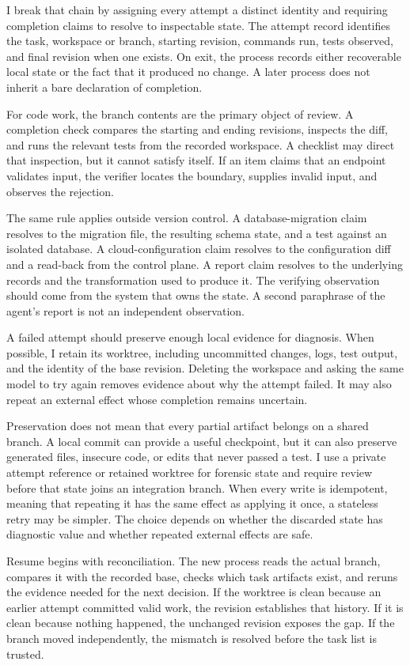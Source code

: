 I break that chain by assigning every attempt a distinct identity and requiring completion claims to resolve to inspectable state. The attempt record identifies the task, workspace or branch, starting revision, commands run, tests observed, and final revision when one exists. On exit, the process records either recoverable local state or the fact that it produced no change. A later process does not inherit a bare declaration of completion.

For code work, the branch contents are the primary object of review. A completion check compares the starting and ending revisions, inspects the diff, and runs the relevant tests from the recorded workspace. A checklist may direct that inspection, but it cannot satisfy itself. If an item claims that an endpoint validates input, the verifier locates the boundary, supplies invalid input, and observes the rejection.

The same rule applies outside version control. A database-migration claim resolves to the migration file, the resulting schema state, and a test against an isolated database. A cloud-configuration claim resolves to the configuration diff and a read-back from the control plane. A report claim resolves to the underlying records and the transformation used to produce it. The verifying observation should come from the system that owns the state. A second paraphrase of the agent's report is not an independent observation.

A failed attempt should preserve enough local evidence for diagnosis. When possible, I retain its worktree, including uncommitted changes, logs, test output, and the identity of the base revision. Deleting the workspace and asking the same model to try again removes evidence about why the attempt failed. It may also repeat an external effect whose completion remains uncertain.

Preservation does not mean that every partial artifact belongs on a shared branch. A local commit can provide a useful checkpoint, but it can also preserve generated files, insecure code, or edits that never passed a test. I use a private attempt reference or retained worktree for forensic state and require review before that state joins an integration branch. When every write is idempotent, meaning that repeating it has the same effect as applying it once, a stateless retry may be simpler. The choice depends on whether the discarded state has diagnostic value and whether repeated external effects are safe.

Resume begins with reconciliation. The new process reads the actual branch, compares it with the recorded base, checks which task artifacts exist, and reruns the evidence needed for the next decision. If the worktree is clean because an earlier attempt committed valid work, the revision establishes that history. If it is clean because nothing happened, the unchanged revision exposes the gap. If the branch moved independently, the mismatch is resolved before the task list is trusted.

